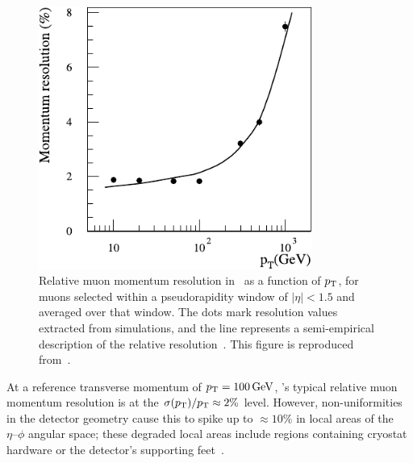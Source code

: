 \begin{figure}[tp]
\centering
\includegraphics[width=0.8\textwidth]{figures/atlas_muon_resolution.pdf}
\caption[
Relative muon momentum resolution in \atlas\ as a function of $\pt$
]{%
Relative muon momentum resolution in \atlas\ as a function of $\pt$, for
muons selected within a pseudorapidity window of $|\eta| < 1.5$ and averaged
over that window.
The dots mark resolution values extracted from simulations, and the line
represents a semi-empirical description of the relative
resolution~\cite{CERN-LHCC-97-022}.
This figure is reproduced from~\cite{atlas1999design1}.
}
\label{fig:atlas_cutaway}
\end{figure}

At a reference transverse momentum of $\pt = 100\,\eV[G]$, \atlas's typical
relative muon momentum resolution is at the $\sigma(\pt) / \pt \approx 2\%$
level.
However, non-uniformities in the detector geometry cause this to spike up to
$\approx 10\%$ in local areas of the $\eta\textrm{--}\phi$ angular space;
these degraded local areas include regions containing cryostat hardware or
the detector's supporting feet~\cite{atlas1999design1, CERN-LHCC-97-022}.


